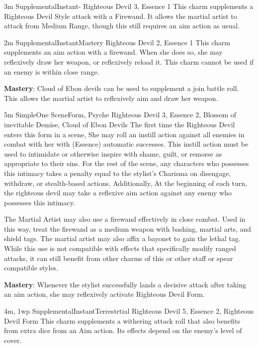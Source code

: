 
{3m}
{Supplemental}{Instant}{-}
{Righteous Devil 3, Essence 1}
This charm supplements a Righteous Devil Style attack with a Firewand.
It allows the martial artist to attack from Medium Range, though this still requires an aim action as usual.

{2m}
{Supplemental}{Instant}{Mastery}
{Righteous Devil 2, Essence 1}
This charm supplements an aim action with a firewand.
When she does so, she may reflexively draw her weapon, or reflexively reload it.
This charm cannot be used if an enemy is within close range.

\textbf{Mastery}: Cloud of Ebon devils can be used to supplement a join battle roll.
This allows the martial artist to reflexively aim and draw her weapon.

 
{5m}
{Simple}{One Scene}{Form, Psyche}
{Righteous Devil 3, Essence 2, Blossom of inevitable Demise, Cloud of Ebon Devils}
The first time the Righteous Devil enters this form in a scene,
She may roll an instill action against all enemies in combat with her with (Essence) automatic successes.
This instill action must be used to intimidate or otherwise inspire with shame, guilt, or remorse as appropriate to their sins.
For the rest of the scene, any characters who possesses this intimacy takes a penalty equal to the stylist's Charisma on disengage, withdraw, or stealth-based actions.
Additionally, At the beginning of each turn, the righteous devil may take a reflexive aim action against any enemy who possesses this intimacy.

The Martial Artist may also use a firewand effectively in close combat.
Used in this way, treat the firewand as a medium weapon with bashing, martial arts, and shield tags.
The martial artist may also affix a bayonet to gain the lethal tag.
While this use is not compatible with effects that specifically modify ranged attacks, it can still benefit from other charms of this or other staff or spear compatible styles.

\textbf{Mastery}: Whenever the stylist successfully lands a decisive attack after taking an aim action,
she may reflexively activate Righteous Devil Form.

{4m, 1wp}
{Supplemental}{Instant}{Terrestrtial}
{Righteous Devil 5, Essence 2, Righteous Devil Form}
This charm supplements a withering attack roll that also benefits from extra dice from an Aim action.
Its effects depend on the enemy's level of cover.

